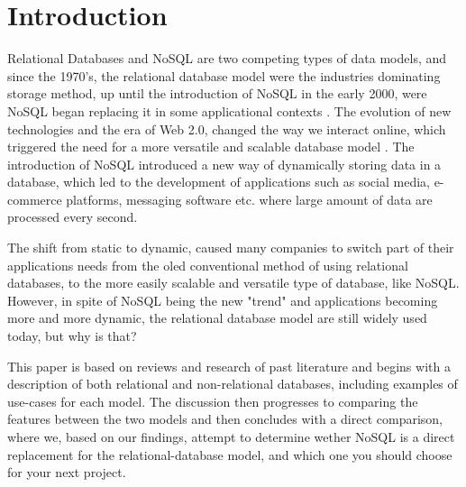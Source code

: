 \section{Introduction}
Relational Databases and NoSQL are two competing types of data models, and since the 1970's, the relational database model were the industries dominating storage method, up until the introduction of NoSQL in the early 2000, were NoSQL began replacing it in some applicational contexts \parencite{a-brief-history-on-non-relational-databases}.   
The evolution of new technologies and the era of Web 2.0, changed the way we interact online, which triggered the need for a more versatile and scalable database model \parencite{a-brief-history-of-nosql}.  
The introduction of NoSQL introduced a new way of dynamically storing data in a database, which led to the development of applications such as social media, e-commerce platforms, messaging software etc. where large amount of data are processed every second.

The shift from static to dynamic, caused many companies to switch part of their applications needs from the oled conventional method of using relational databases, to the more easily scalable and versatile type of database, like NoSQL.
However, in spite of NoSQL being the new "trend" and applications becoming more and more dynamic, the relational database model are still widely used today, but why is that?

This paper is based on reviews and research of past literature and begins with a description of both relational and non-relational databases, including examples of use-cases for each model. The discussion then progresses to comparing the features between the two models and then concludes with a direct comparison, where we, based on our findings, attempt to determine wether NoSQL is a direct replacement for the relational-database model, and which one you should choose for your next project.  
